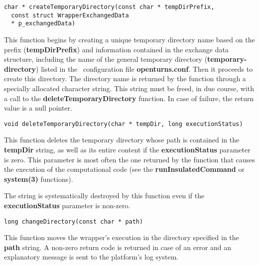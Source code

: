 \lstset{language=C++, basicstyle=\normalsize}
\begin{lstlisting}[frame=TRBL]
  char * createTemporaryDirectory(const char * tempDirPrefix,
  const struct WrapperExchangedData
  * p_exchangedData)
\end{lstlisting}

This function begins by creating a unique temporary directory name based on the prefix ({\bf tempDirPrefix}) and information contained in the exchange data structure, including the name of the general temporary directory ({\bf temporary-directory}) listed in the \OT\ configuration file {\bf openturns.conf}. Then it proceeds to create this directory. The directory name is returned by the function through a specially allocated character string. This string must be freed, in due course, with a call to the {\bf deleteTemporaryDirectory} function. In case of failure, the return value is a null pointer.

\lstset{language=C++, basicstyle=\normalsize}
\begin{lstlisting}[frame=TRBL]
  void deleteTemporaryDirectory(char * tempDir, long executionStatus)
\end{lstlisting}

This function deletes the temporary directory whose path is contained in the {\bf tempDir} string, as well as its entire content if the {\bf executionStatus} parameter is zero. This parameter is most often the one returned by the function that causes the execution of the computational code (see the {\bf runInsulatedCommand} or {\bf system(3)} functions).

The string is systematically destroyed by this function even if the {\bf executionStatus} parameter is non-zero.

\lstset{language=C++, basicstyle=\normalsize}
\begin{lstlisting}[frame=TRBL]
  long changeDirectory(const char * path)
\end{lstlisting}

This function moves the wrapper's execution in the directory specified in the {\bf path} string. A non-zero return code is returned in case of an error and an explanatory message is sent to the platform's log system.

\ \\


